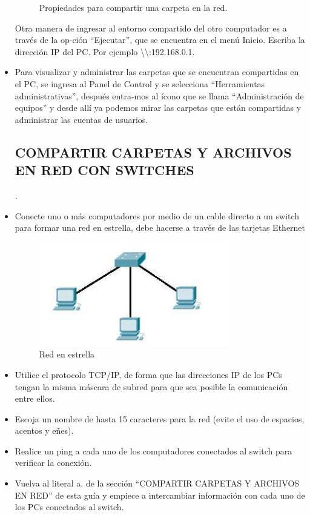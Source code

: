 \documentclass[journal]{IEEEtran}
\begin{document}
\begin{itemize}
\begin{center}
\begin{figure}[H]
\caption{Propiedades para compartir una carpeta en la red.}
\end{figure}
\end{center}
Otra manera de ingresar al entorno compartido del otro computador es a través de la op-ción “Ejecutar”, que se encuentra en el menú Inicio. Escriba la dirección IP del PC. Por ejemplo \textbackslash{}\textbackslash{}:192.168.0.1.\\
\item Para visualizar y administrar las carpetas que se encuentran compartidas en el PC, se
ingresa al Panel de Control y se selecciona “Herramientas administrativas”, después entra-mos al ícono que se llama “Administración de equipos” y desde allí ya podemos mirar las carpetas que están compartidas y administrar las cuentas de usuarios.
\subsection{COMPARTIR CARPETAS Y ARCHIVOS EN RED CON SWITCHES}.
\item Conecte uno o más computadores por medio de un cable directo a un switch para formar una red en estrella, debe hacerse a través de las tarjetas Ethernet
\begin{center}
\begin{figure}[H]
\centering
\includegraphics[scale=0.75]{11.JPG} 
\caption{Red en estrella}
\end{figure}
\end{center}
\item Utilice el protocolo TCP/IP, de forma que las direcciones IP de los PCs tengan la misma máscara de subred para que sea posible la comunicación entre ellos.\\
\item Escoja un nombre de hasta 15 caracteres para la red (evite el uso de espacios, acentos y eñes).\\
\item Realice un ping a cada uno de los computadores conectados al switch para verificar la conexión.\\
\item  Vuelva al literal a. de la sección “COMPARTIR CARPETAS Y ARCHIVOS EN RED” de esta guía y empiece a intercambiar información con cada uno de los PCs conectados al switch.
\end{itemize}
\end{document}

